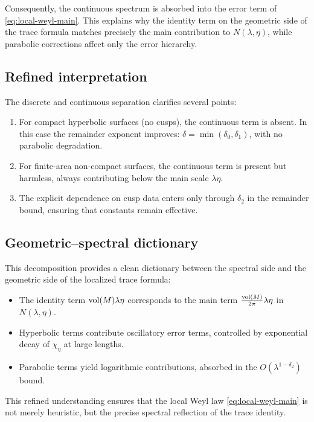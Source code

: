 Consequently, the continuous spectrum is absorbed into the error term of \eqref{eq:local-weyl-main}. This explains why the identity term on the geometric side of the trace formula matches precisely the main contribution to $N(\lambda,\eta)$, while parabolic corrections affect only the error hierarchy.

\subsection{Refined interpretation}

The discrete and continuous separation clarifies several points:

\begin{enumerate}
  \item For compact hyperbolic surfaces (no cusps), the continuous term is absent. In this case the remainder exponent improves: $\delta=\min(\delta_0,\delta_1)$, with no parabolic degradation.
  \item For finite-area non-compact surfaces, the continuous term is present but harmless, always contributing below the main scale $\lambda\eta$.
  \item The explicit dependence on cusp data enters only through $\delta_2$ in the remainder bound, ensuring that constants remain effective.
\end{enumerate}

\subsection{Geometric–spectral dictionary}

This decomposition provides a clean dictionary between the spectral side and the geometric side of the localized trace formula:
\begin{itemize}
  \item The identity term $\operatorname{vol}(M)\lambda\eta$ corresponds to the main term $\tfrac{\operatorname{vol}(M)}{2\pi}\lambda\eta$ in $N(\lambda,\eta)$.
  \item Hyperbolic terms contribute oscillatory error terms, controlled by exponential decay of $\widehat{\chi}_\eta$ at large lengths.
  \item Parabolic terms yield logarithmic contributions, absorbed in the $O(\lambda^{1-\delta_2})$ bound.
\end{itemize}

This refined understanding ensures that the local Weyl law \eqref{eq:local-weyl-main} is not merely heuristic, but the precise spectral reflection of the trace identity.

